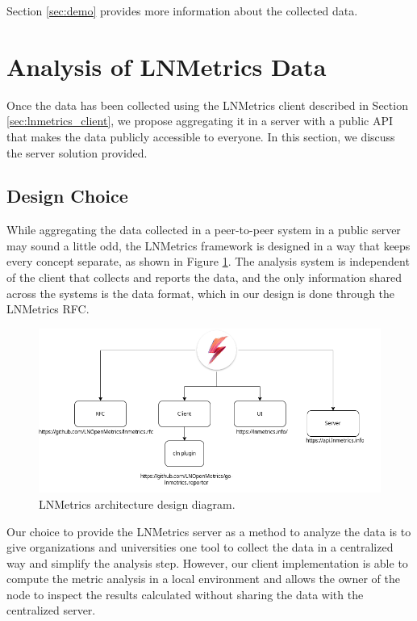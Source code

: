 Section \ref{sec:demo} provides more information about the collected data.

\section{Analysis of LNMetrics Data}
\label{sec:lnmetrics_server}

Once the data has been collected using the LNMetrics client described in 
Section \ref{sec:lnmetrics_client}, we propose aggregating it in a server with 
a public API that makes the data publicly accessible to everyone. In this 
section, we discuss the server solution provided.

\subsection{Design Choice}

While aggregating the data collected in a peer-to-peer system in a public 
server may sound a little odd, the LNMetrics framework is designed in a way 
that keeps every concept separate, as shown in Figure \ref{fig:lnmetrics_architecture}. 
The analysis system is independent of the client that collects and reports the data, and
the only information shared across the systems is the data format, which in our
design is done through the LNMetrics RFC.

\begin{figure}
    \begin{center}
    \includegraphics[scale=0.5]{imgs/lnmetrics-architecture.drawio.png}
    \end{center}
   \caption{LNMetrics architecture design diagram.}
    \label{fig:lnmetrics_architecture}
\end{figure}

Our choice to provide the LNMetrics server as a method to analyze the data 
is to give organizations and universities one tool to collect the data in 
a centralized way and simplify the analysis step. However, our client
implementation is able to compute the metric analysis in a local environment 
and allows the owner of the node to inspect the results calculated without 
sharing the data with the centralized server.

